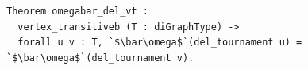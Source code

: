 \begin{lstlisting}[language=Rocq]
Theorem omegabar_del_vt :
  vertex_transitiveb (T : diGraphType) ->
  forall u v : T, `$\bar\omega$`(del_tournament u) = `$\bar\omega$`(del_tournament v).
\end{lstlisting}
